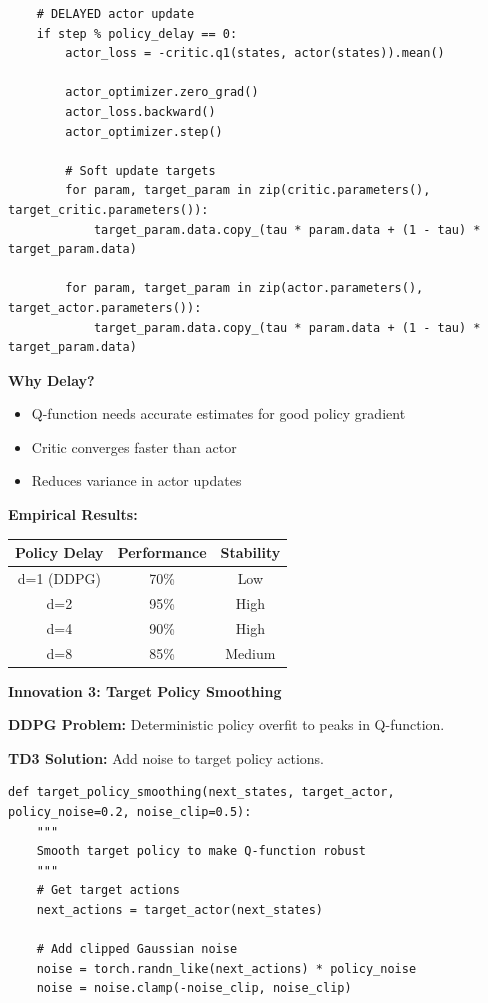 \documentclass[12pt]{article}
\begin{document}
{{\begin{verbatim}
    # DELAYED actor update
    if step % policy_delay == 0:
        actor_loss = -critic.q1(states, actor(states)).mean()
        
        actor_optimizer.zero_grad()
        actor_loss.backward()
        actor_optimizer.step()
        
        # Soft update targets
        for param, target_param in zip(critic.parameters(), target_critic.parameters()):
            target_param.data.copy_(tau * param.data + (1 - tau) * target_param.data)
        
        for param, target_param in zip(actor.parameters(), target_actor.parameters()):
            target_param.data.copy_(tau * param.data + (1 - tau) * target_param.data)
\end{verbatim}

\textbf{Why Delay?}
\begin{itemize}
\item Q-function needs accurate estimates for good policy gradient
\item Critic converges faster than actor
\item Reduces variance in actor updates
\end{itemize}

\textbf{Empirical Results:}
\begin{center}
\begin{tabular}{|c|c|c|}
\hline
\textbf{Policy Delay} & \textbf{Performance} & \textbf{Stability} \\
\hline
d=1 (DDPG) & 70\% & Low \\
d=2 & 95\% & High \\
d=4 & 90\% & High \\
d=8 & 85\% & Medium \\
\hline
\end{tabular}
\end{center}

\textbf{Innovation 3: Target Policy Smoothing}

\textbf{DDPG Problem:} Deterministic policy overfit to peaks in Q-function.

\textbf{TD3 Solution:} Add noise to target policy actions.

\begin{verbatim}
def target_policy_smoothing(next_states, target_actor, policy_noise=0.2, noise_clip=0.5):
    """
    Smooth target policy to make Q-function robust
    """
    # Get target actions
    next_actions = target_actor(next_states)
    
    # Add clipped Gaussian noise
    noise = torch.randn_like(next_actions) * policy_noise
    noise = noise.clamp(-noise_clip, noise_clip)
    

\end{verbatim}}}
\end{document}
